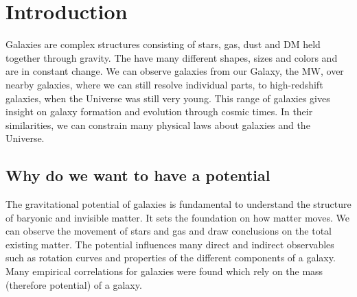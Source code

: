 \section{Introduction}\label{sec:Intro}
Galaxies are complex structures consisting of stars, gas, dust and \ac{DM} held together through gravity. The have many different shapes, sizes and colors and are in constant change. We can observe galaxies from our Galaxy, the \ac{MW}, over nearby galaxies, where we can still resolve individual parts, to high-redshift galaxies, when the Universe was still very young. This range of galaxies gives insight on galaxy formation and evolution through cosmic times. In their similarities, we can constrain many physical laws about galaxies and the Universe. 

\subsection{Why do we want to have a potential}
The gravitational potential of galaxies is fundamental to understand the structure of baryonic and invisible matter. It sets the foundation on how matter moves. We can observe the movement of stars and gas and draw conclusions on the total existing matter. The potential influences many direct and indirect observables such as rotation curves and properties of the different components of a galaxy. Many empirical correlations for galaxies were found which rely on the mass (therefore potential) of a galaxy. 

